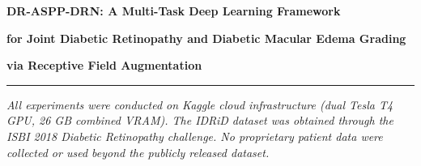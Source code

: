 \documentclass[12pt,a4paper]{article}
\begin{document}
\begin{titlepage}
\centering
\vspace*{1.5cm}

{\LARGE \textbf{DR-ASPP-DRN: A Multi-Task Deep Learning Framework} \par}
\vspace{0.4cm}
{\LARGE \textbf{for Joint Diabetic Retinopathy and Diabetic Macular Edema Grading} \par}
\vspace{0.4cm}
{\LARGE \textbf{via Receptive Field Augmentation} \par}


\newpage
\hrule
\vspace{0.5cm}
{\small \textit{All experiments were conducted on Kaggle cloud infrastructure (dual Tesla T4 GPU, 26 GB combined VRAM). The IDRiD dataset was obtained through the ISBI 2018 Diabetic Retinopathy challenge. No proprietary patient data were collected or used beyond the publicly released dataset.}}

\end{titlepage}

\newpage
\end{document}
